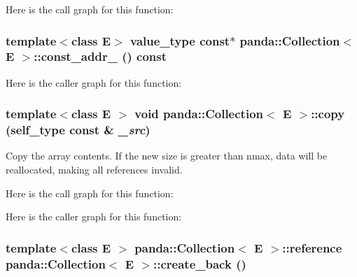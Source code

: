 Here is the call graph for this function:\hypertarget{classpanda_1_1Collection_a15e865455a9275efe83ca65f1a96b3e9}{
\subsubsection[{const\_\-addr\_\-}]{\setlength{\rightskip}{0pt plus 5cm}template$<$class E$>$ {\bf value\_\-type} const$\ast$ {\bf panda::Collection}$<$ E $>$::const\_\-addr\_\- () const}}
\label{classpanda_1_1Collection_a15e865455a9275efe83ca65f1a96b3e9}


Here is the caller graph for this function:\hypertarget{classpanda_1_1Collection_ad194c8ae8355ce5ba6c04518a223cde1}{
\subsubsection[{copy}]{\setlength{\rightskip}{0pt plus 5cm}template$<$class E $>$ void {\bf panda::Collection}$<$ E $>$::copy ({\bf self\_\-type} const \& {\em \_\-src})}}
\label{classpanda_1_1Collection_ad194c8ae8355ce5ba6c04518a223cde1}


Copy the array contents. If the new size is greater than nmax, data will be reallocated, making all references invalid. 

Here is the call graph for this function:

Here is the caller graph for this function:\hypertarget{classpanda_1_1Collection_a76d29ff9b6366c3a39f2aa06ac6b0604}{
\subsubsection[{create\_\-back}]{\setlength{\rightskip}{0pt plus 5cm}template$<$class E $>$ {\bf panda::Collection}$<$ E $>$::{\bf reference} {\bf panda::Collection}$<$ E $>$::create\_\-back ()}}
\label{classpanda_1_1Collection_a76d29ff9b6366c3a39f2aa06ac6b0604}


